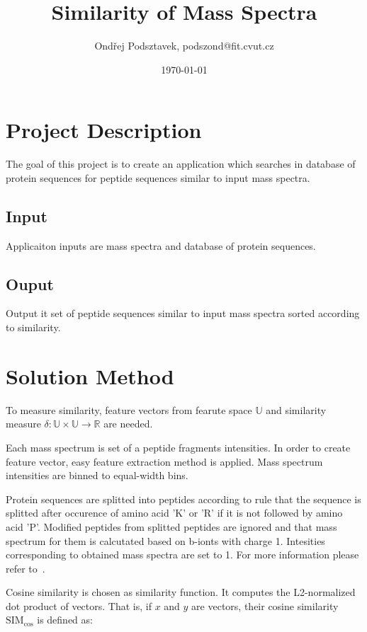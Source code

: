 \documentclass[a4paper,10pt,twocolumn]{article}
\title{Similarity of Mass Spectra}
\date{\today}
\author{Ondřej Podsztavek, podszond@fit.cvut.cz}
\begin{document}
\maketitle

\section{Project Description}

The goal of this project is to create an application which searches
in database of protein sequences for peptide sequences similar to input
mass spectra.

\subsection{Input}

Applicaiton inputs are mass spectra and database of protein
sequences.

\subsection{Ouput}

Output it set of peptide sequences similar to input mass
spectra sorted according to similarity.

\section{Solution Method}

To measure similarity, feature vectors from fearute space \(\mathbb{U}\)
and similarity measure \(\delta: \mathbb{U} \times \mathbb{U} \to \mathbb{R}\)
are needed.

Each mass spectrum is set of a peptide fragments intensities. In order to create
feature vector, easy feature extraction method is applied. Mass spectrum
intensities are binned to equal-width bins.

Protein sequences are splitted into peptides according to rule that the
sequence is splitted after occurence of amino acid 'K' or 'R' if it is not
followed by amino acid 'P'. Modified peptides from splitted peptides are
ignored and that mass spectrum for them is calcutated based on b-ionts with
charge 1. Intesities corresponding to obtained mass spectra are set to 1.
For more information please refer to~\cite{novak2009}.

Cosine similarity is chosen as similarity function. It computes the
L2-normalized dot product of vectors. That is, if \(x\) and \(y\) are vectors,
their cosine similarity \(\text{SIM}_{\cos}\) is defined as:
\end{document}
